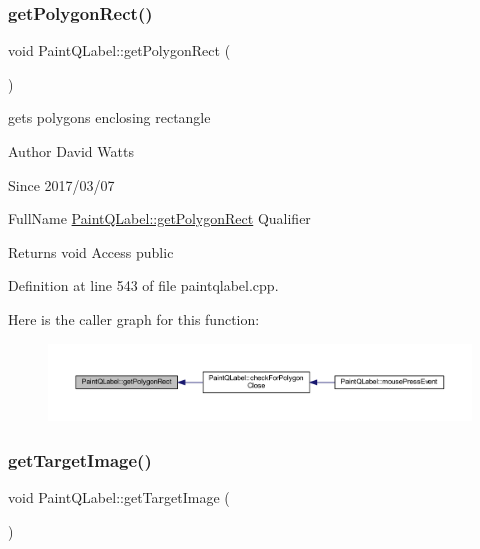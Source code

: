 \subsubsection{\texorpdfstring{get\+Polygon\+Rect()}{getPolygonRect()}}
{\footnotesize\ttfamily void Paint\+Q\+Label\+::get\+Polygon\+Rect (\begin{DoxyParamCaption}{ }\end{DoxyParamCaption})}

gets polygon\textquotesingle{}s enclosing rectangle

\begin{DoxyAuthor}{Author}
David Watts 
\end{DoxyAuthor}
\begin{DoxySince}{Since}
2017/03/07
\end{DoxySince}
Full\+Name \hyperlink{class_paint_q_label_a332bf0f6137c8613fbdeac4bd0c1516e}{Paint\+Q\+Label\+::get\+Polygon\+Rect} Qualifier \begin{DoxyReturn}{Returns}
void Access public 
\end{DoxyReturn}


Definition at line 543 of file paintqlabel.\+cpp.

Here is the caller graph for this function\+:
\nopagebreak
\begin{figure}[H]
\begin{center}
\leavevmode
\includegraphics[width=350pt]{class_paint_q_label_a332bf0f6137c8613fbdeac4bd0c1516e_icgraph}
\end{center}
\end{figure}
\mbox{\label{class_paint_q_label_a409e0869a3115968f025878ad49d9883}} 
\subsubsection{\texorpdfstring{get\+Target\+Image()}{getTargetImage()}}
{\footnotesize\ttfamily void Paint\+Q\+Label\+::get\+Target\+Image (\begin{DoxyParamCaption}{ }\end{DoxyParamCaption})}

